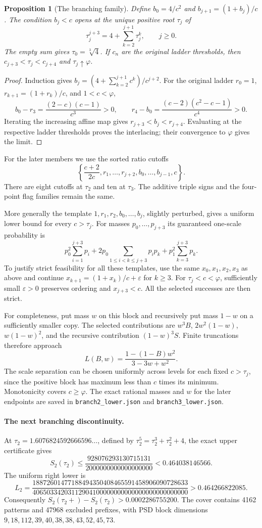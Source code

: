 \documentclass[11pt]{article}
\newtheorem{proposition}{Proposition}
\begin{document}
\begin{proposition}[The branching family]
Define $b_0=4/c^2$ and $b_{j+1}=(1+b_j)/c$. The condition $b_j<c$
opens at the unique positive root $\tau_j$ of
\[
\boxed{\tau_j^{j+3}=4+\sum_{k=2}^{j+1}\tau_j^k},\qquad j\ge0.
\]
The empty sum gives $\tau_0=\sqrt[3]4$. If $c_n$ are the original
ladder thresholds, then $c_{j+3}<\tau_j<c_{j+4}$ and
$\tau_j\uparrow\varphi$.
\end{proposition}
\begin{proof}
Induction gives
$b_j=(4+\sum_{k=2}^{j+1}c^k)/c^{j+2}$. For the original ladder
$r_0=1$, $r_{k+1}=(1+r_k)/c$, and $1<c<\varphi$,
\[
b_0-r_3=\frac{(2-c)(c-1)}{c^3}>0,\qquad
r_4-b_0=\frac{(c-2)(c^2-c-1)}{c^4}>0.
\]
Iterating the increasing affine map gives $r_{j+3}<b_j<r_{j+4}$.
Evaluating at the respective ladder thresholds proves the interlacing;
their convergence to $\varphi$ gives the limit.
\end{proof}

For the later members we use the sorted ratio cutoffs
\[
\left\{\frac{c+2}{2c},r_1,\ldots,r_{j+2},b_0,\ldots,b_{j-1},c\right\}.
\]
There are eight cutoffs at $\tau_2$ and ten at $\tau_3$. The additive
triple signs and the four-point flag families remain the same.

More generally the template $1,r_1,r_2,b_0,\ldots,b_j$, slightly perturbed,
gives a uniform lower bound for every $c>\tau_j$. For masses
$p_0,\ldots,p_{j+3}$ its guaranteed one-scale probability is
\[
p_0^2\sum_{i=1}^{j+3}p_i
+2p_0\sum_{1\le i<k\le j+3}p_i p_k
+p_1^2\sum_{k=3}^{j+3}p_k.
\]
To justify strict feasibility for all these templates, use the same
$x_0,x_1,x_2,x_3$ as above and continue
$x_{k+1}=(1+x_k)/c+\varepsilon$ for $k\ge3$.
For $\tau_j<c<\varphi$, sufficiently small $\varepsilon>0$ preserves
ordering and $x_{j+3}<c$. All the selected successes are then strict.

For completeness, put mass $w$ on this block and recursively put mass
$1-w$ on a sufficiently smaller copy. The selected contributions are
$w^3B$, $2w^2(1-w)$, $w(1-w)^2$, and the recursive contribution
$(1-w)^3 S$. Finite truncations therefore approach
\[
L(B,w)=\frac{1-(1-B)w^2}{3-3w+w^2}.
\]
The scale separation can be chosen uniformly across levels for each fixed
$c>\tau_j$, since the positive block has maximum less than $c$ times its
minimum. Monotonicity covers $c\ge\varphi$.
The exact rational masses and $w$ for the later endpoints are saved in
\texttt{branch2\_lower.json} and \texttt{branch3\_lower.json}.

\paragraph{The next branching discontinuity.}
At $\tau_2=1.6076824592666596\ldots$, defined by
$\tau_2^5=\tau_2^3+\tau_2^2+4$, the exact upper certificate gives
\[
S_2(\tau_2)\le\frac{928076293130715131}{2000000000000000000}
<0.464038146566.
\]
The uniform right lower is
\[
L_2=\frac{18872601477188494350408465591458906090728633}
{40650334203112904100000000000000000000000000}
>0.464266822085.
\]
Consequently $S_2(\tau_2+)-S_2(\tau_2)>0.0002286755200$.
The cover contains 4162 patterns and 47968 excluded prefixes, with PSD
block dimensions $9,18,112,39,40,38,38,43,52,45,73$.
\end{document}
